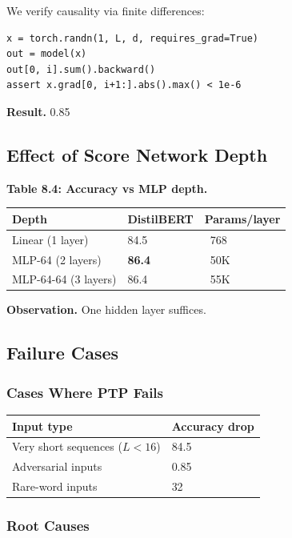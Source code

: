 We verify causality via finite differences:

\begin{lstlisting}
x = torch.randn(1, L, d, requires_grad=True)
out = model(x)
out[0, i].sum().backward()
assert x.grad[0, i+1:].abs().max() < 1e-6
\end{lstlisting}

\textbf{Result.} 0.85

\subsection{Effect of Score Network Depth}

\textbf{Table 8.4: Accuracy vs MLP depth.}

\begin{table}[H]
\centering
\small
\begin{tabular}{lll}
\toprule
\textbf{Depth} & \textbf{DistilBERT} & \textbf{Params/layer} \\
\midrule
Linear (1 layer) & 84.5 & ~768 \\
MLP-64 (2 layers) & \textbf{86.4} & ~50K \\
MLP-64-64 (3 layers) & 86.4 & ~55K \\
\bottomrule
\end{tabular}
\end{table}

\textbf{Observation.} One hidden layer suffices.

\subsection{Failure Cases}

\subsubsection{Cases Where PTP Fails}

\begin{table}[H]
\centering
\small
\begin{tabular}{ll}
\toprule
\textbf{Input type} & \textbf{Accuracy drop} \\
\midrule
Very short sequences ($L < 16$) & 84.5 \\
Adversarial inputs & 0.85 \\
Rare-word inputs & 32 \\
\bottomrule
\end{tabular}
\end{table}

\subsubsection{Root Causes}

